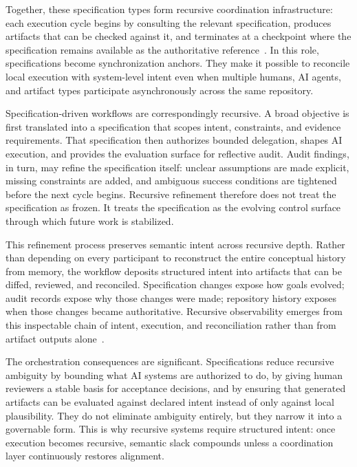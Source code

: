 Together, these specification types form recursive coordination infrastructure: each execution cycle begins by consulting the relevant specification, produces artifacts that can be checked against it, and terminates at a checkpoint where the specification remains available as the authoritative reference~\cite{Beer1972BrainFirm}. In this role, specifications become synchronization anchors. They make it possible to reconcile local execution with system-level intent even when multiple humans, AI agents, and artifact types participate asynchronously across the same repository.

Specification-driven workflows are correspondingly recursive. A broad objective is first translated into a specification that scopes intent, constraints, and evidence requirements. That specification then authorizes bounded delegation, shapes AI execution, and provides the evaluation surface for reflective audit. Audit findings, in turn, may refine the specification itself: unclear assumptions are made explicit, missing constraints are added, and ambiguous success conditions are tightened before the next cycle begins. Recursive refinement therefore does not treat the specification as frozen. It treats the specification as the evolving control surface through which future work is stabilized.

This refinement process preserves semantic intent across recursive depth. Rather than depending on every participant to reconstruct the entire conceptual history from memory, the workflow deposits structured intent into artifacts that can be diffed, reviewed, and reconciled. Specification changes expose how goals evolved; audit records expose why those changes were made; repository history exposes when those changes became authoritative. Recursive observability emerges from this inspectable chain of intent, execution, and reconciliation rather than from artifact outputs alone~\cite{Chandy1985DistributedSnapshots}.

The orchestration consequences are significant. Specifications reduce recursive ambiguity by bounding what AI systems are authorized to do, by giving human reviewers a stable basis for acceptance decisions, and by ensuring that generated artifacts can be evaluated against declared intent instead of only against local plausibility. They do not eliminate ambiguity entirely, but they narrow it into a governable form. This is why recursive systems require structured intent: once execution becomes recursive, semantic slack compounds unless a coordination layer continuously restores alignment.

